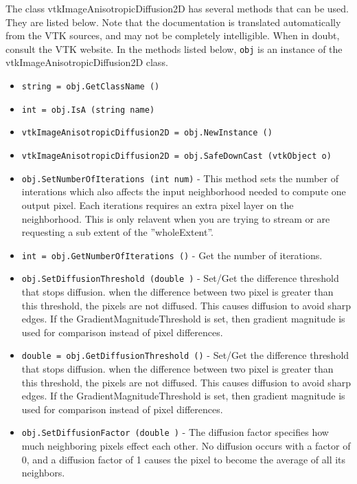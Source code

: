 The class vtkImageAnisotropicDiffusion2D has several methods that can be used.
  They are listed below.
Note that the documentation is translated automatically from the VTK sources,
and may not be completely intelligible.  When in doubt, consult the VTK website.
In the methods listed below, \verb|obj| is an instance of the vtkImageAnisotropicDiffusion2D class.
\begin{itemize}
\item  \verb|string = obj.GetClassName ()|

\item  \verb|int = obj.IsA (string name)|

\item  \verb|vtkImageAnisotropicDiffusion2D = obj.NewInstance ()|

\item  \verb|vtkImageAnisotropicDiffusion2D = obj.SafeDownCast (vtkObject o)|

\item  \verb|obj.SetNumberOfIterations (int num)| -  This method sets the number of interations which also affects the
 input neighborhood needed to compute one output pixel.  Each iterations
 requires an extra pixel layer on the neighborhood.  This is only relavent
 when you are trying to stream or are requesting a sub extent of the ''wholeExtent''.

\item  \verb|int = obj.GetNumberOfIterations ()| -  Get the number of iterations.

\item  \verb|obj.SetDiffusionThreshold (double )| -  Set/Get the difference threshold that stops diffusion. 
 when the difference between two pixel is greater than this threshold,
 the pixels are not diffused.  This causes diffusion to avoid sharp edges.
 If the GradientMagnitudeThreshold is set, then gradient magnitude is used 
 for comparison instead of pixel differences.

\item  \verb|double = obj.GetDiffusionThreshold ()| -  Set/Get the difference threshold that stops diffusion. 
 when the difference between two pixel is greater than this threshold,
 the pixels are not diffused.  This causes diffusion to avoid sharp edges.
 If the GradientMagnitudeThreshold is set, then gradient magnitude is used 
 for comparison instead of pixel differences.

\item  \verb|obj.SetDiffusionFactor (double )| -  The diffusion factor specifies  how much neighboring pixels effect each other.
 No diffusion occurs with a factor of 0, and a diffusion factor of 1 causes
 the pixel to become the average of all its neighbors.


\end{itemize}
